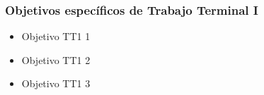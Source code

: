 \subsubsection{Objetivos específicos de Trabajo Terminal I}

\begin{itemize}
    \item Objetivo TT1 1
    \item Objetivo TT1 2
    \item Objetivo TT1 3
\end{itemize}